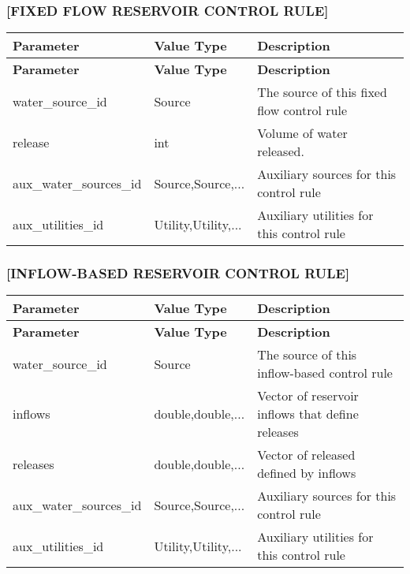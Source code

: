 \subsubsection*{\mbox{[}F\+I\+X\+ED F\+L\+OW R\+E\+S\+E\+R\+V\+O\+IR C\+O\+N\+T\+R\+OL R\+U\+LE\mbox{]}}

\tabulinesep=1mm
\begin{longtabu} spread 0pt [c]{*{3}{|X[-1]}|}
\hline
\rowcolor{\tableheadbgcolor}\textbf{ Parameter  }&\textbf{ Value Type  }&\textbf{ Description   }\\
\endfirsthead
\hline
\endfoot
\hline
\rowcolor{\tableheadbgcolor}\textbf{ Parameter  }&\textbf{ Value Type  }&\textbf{ Description   }\\
\endhead
water\+\_\+source\+\_\+id  &Source  &The source of this fixed flow control rule   \\
release  &int  &Volume of water released.   \\
aux\+\_\+water\+\_\+sources\+\_\+id  &Source,Source,...  &Auxiliary sources for this control rule   \\
aux\+\_\+utilities\+\_\+id  &Utility,Utility,...  &Auxiliary utilities for this control rule   \\
\end{longtabu}


\subsubsection*{\mbox{[}I\+N\+F\+L\+O\+W-\/\+B\+A\+S\+ED R\+E\+S\+E\+R\+V\+O\+IR C\+O\+N\+T\+R\+OL R\+U\+LE\mbox{]}}

\tabulinesep=1mm
\begin{longtabu} spread 0pt [c]{*{3}{|X[-1]}|}
\hline
\rowcolor{\tableheadbgcolor}\textbf{ Parameter  }&\textbf{ Value Type  }&\textbf{ Description   }\\
\endfirsthead
\hline
\endfoot
\hline
\rowcolor{\tableheadbgcolor}\textbf{ Parameter  }&\textbf{ Value Type  }&\textbf{ Description   }\\
\endhead
water\+\_\+source\+\_\+id  &Source  &The source of this inflow-\/based control rule   \\
inflows  &double,double,...  &Vector of reservoir inflows that define releases   \\
releases  &double,double,...  &Vector of released defined by inflows   \\
aux\+\_\+water\+\_\+sources\+\_\+id  &Source,Source,...  &Auxiliary sources for this control rule   \\
aux\+\_\+utilities\+\_\+id  &Utility,Utility,...  &Auxiliary utilities for this control rule   \\
\end{longtabu}


